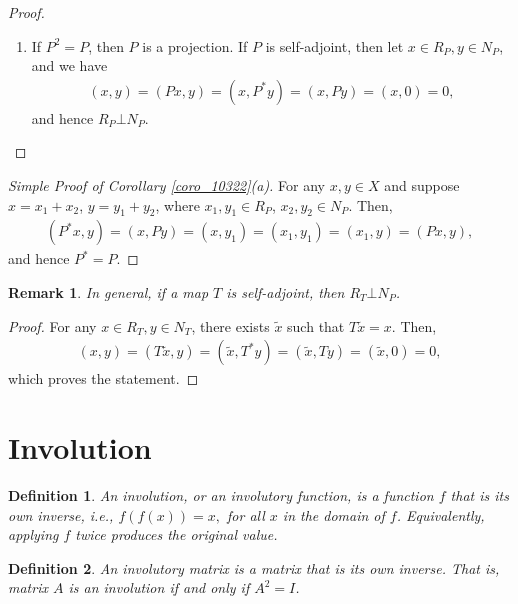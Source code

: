 \documentclass[11pt]{book}
\newtheorem{definition}{Definition}[chapter]
\newtheorem{remark}{Remark}[chapter]
\theoremstyle{definition}
\numberwithin{equation}{chapter}
\begin{document}
\begin{subappendices}
\begin{proof}
\begin{enumerate}[label=(\alph*)]
    \item If $P^2 = P$, then $P$ is a projection. If $P$ is self-adjoint, then let $x \in R_P, y \in N_P$, and we have
    \begin{align*}
        (x, y) = (Px, y) = (x, P^*y) = (x, Py) = (x, 0) = 0,
    \end{align*}
    and hence $R_P \bot N_P$.
\end{enumerate}
\end{proof}

\medskip

\begin{proof}[Simple Proof of Corollary \ref{coro_10322}(a)]
For any $x, y \in X$ and suppose $x = x_1 + x_2$, $y = y_1 + y_2$, where $x_1, y_1 \in R_P$, $x_2, y_2 \in N_P$. Then,
\begin{align*}
    (P^*x,y) = (x,Py) = (x,y_1) = (x_1,y_1) = (x_1,y) = (Px,y),
\end{align*}
and hence $P^* = P$.
\end{proof}

\medskip

\begin{remark}
In general, if a map $T$ is self-adjoint, then $R_T \bot N_P$.
\end{remark}
\begin{proof}
For any $x \in R_T, y\in N_T$, there exists $\widetilde{x}$ such that $T\widetilde{x} = x$. Then,
\begin{align*}
    (x,y) = \left(T\widetilde{x},y\right) = \left(\widetilde{x},T^*y\right) = \left(\widetilde{x},Ty\right) = \left(\widetilde{x},0\right) = 0,
\end{align*}
which proves the statement.
\end{proof}

\medskip

\section{Involution}
\begin{definition}
An involution, or an involutory function, is a function $f$ that is its own inverse, i.e., $f(f(x)) = x,$ for all $x$ in the domain of $f$. Equivalently, applying $f$ twice produces the original value.
\end{definition}

\medskip

\begin{definition}
An involutory matrix is a matrix that is its own inverse. That is, matrix $A$ is an involution if and only if $A^2 = I$.
\end{definition}


\end{subappendices}
\end{document}
